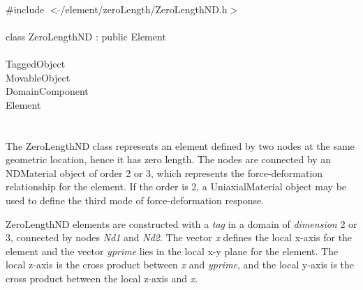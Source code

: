 
   \\
\indent \#include $<\tilde{ }$/element/zeroLength/ZeroLengthND.h$>$  \\

  \\
\indent class ZeroLengthND : public Element \\

 \\
\indent TaggedObject \\
\indent MovableObject \\
\indent\indent DomainComponent \\
\indent\indent\indent Element \\
\indent\indent\indent{} \\

  \\
\indent 
The ZeroLengthND class represents an element defined by two nodes at the same geometric
location, hence it has zero length.
The nodes are connected by an NDMaterial object of order 2 or 3, which
represents the force-deformation relationship for the element. If the order
is 2, a UniaxialMaterial object may be used to define the third mode of
force-deformation response.

ZeroLengthND elements are constructed with a {\em tag} in a domain of {\em dimension} 2 or 3,
connected by nodes {\em Nd1} and {\em Nd2}. 
The vector {\em x} defines the local x-axis for the element and the vector {\em yprime}
lies in the local x-y plane for the element.  The local z-axis is the cross product between 
{\em x} and {\em yprime}, and the local y-axis is the cross product between the local z-axis
and {\em x}.
\\

